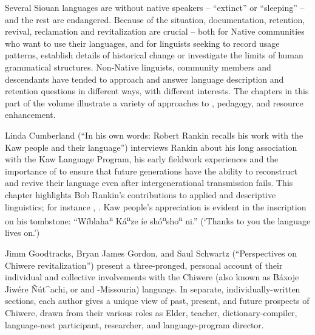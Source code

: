 \begin{refsection}

Several Siouan languages are without native speakers -- ``extinct'' or ``sleeping'' -- and the rest are endangered. Because of the situation, documentation, retention, revival, reclamation and revitalization are crucial -- both for Native communities who want to use their languages, and for linguists seeking to record usage patterns, establish details of historical change or investigate the limits of human grammatical structures. Non-Native linguists, community members and descendants have tended to approach and answer language description and retention questions in different ways, with different interests. The chapters in this part of the volume illustrate a variety of approaches to , pedagogy, and resource enhancement.
 
Linda Cumberland (``In his own words: Robert Rankin recalls his work with the Kaw people and their language'') interviews Rankin about his long association with the Kaw Language Program, his early fieldwork experiences and the importance of  to ensure that future generations have the ability to reconstruct and revive their language even after intergenerational transmission fails. This chapter highlights Bob Rankin's contributions to applied and descriptive linguistics; for instance \citet{CumberlandRankin2012}, \citet{Rankin1989}. Kaw people's appreciation is evident in the inscription on his tombstone: ``W\'iblaha\textsuperscript{n} K\'a\textsuperscript{n}ze \'ie sh\'o\textsuperscript{n}sho\textsuperscript{n} ni.'' (`Thanks to you the  language lives on.')
 

Jimm Goodtracks, Bryan James Gordon, and Saul Schwartz (``Perspectives on Chiwere revitalization'') present a three-pronged, personal account of their individual and collective involvements with the Chiwere (also known as Báxoje Jiwére \~{N}út\^{}achi, or  and -Missouria) language. In separate, individually-written sections, each author gives a unique view of past, present, and future prospects of Chiwere, drawn from their various roles as Elder, teacher, dictionary-compiler, language-nest participant, researcher, and language-program director. 


\end{refsection}
